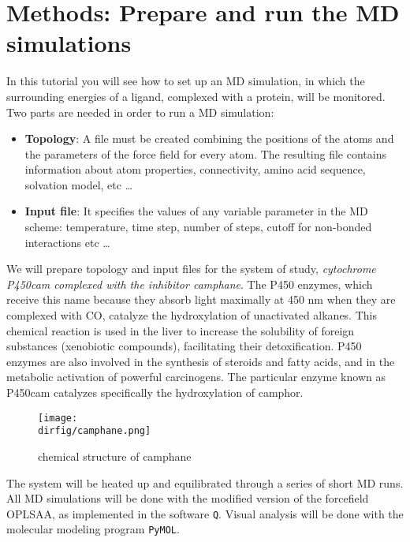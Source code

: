 \documentclass[a4paper,12pt]{article}
\newcommand{\q}{\texttt{Q}}
\newcommand{\pymol}{\texttt{PyMOL}}
\newcommand{\dirfig}{./images}
\begin{document}
\section{Methods: Prepare and run the MD simulations}
In this tutorial you will see how to set up an MD simulation, in which the surrounding energies of a ligand, complexed with a protein, will be monitored.\\
Two parts are needed in order to run a MD simulation:
\begin {itemize}
\item {\bf Topology}: A file must be created combining the positions of the atoms and the parameters of the force field for every atom. The resulting file contains information about atom properties, connectivity, amino acid sequence, solvation model, etc \ldots
\item {\bf Input file}: It specifies the values of any variable parameter in the MD scheme: temperature, time step, number of steps, cutoff for non-bonded interactions etc \ldots
\end {itemize}
We will prepare topology and input files for the system of study, {\it cytochrome P450cam complexed with the inhibitor camphane}. The P450 enzymes, which receive this name because they absorb light maximally at 450 nm when they are complexed with CO, catalyze the hydroxylation of unactivated alkanes. This chemical reaction is used in the liver to increase the solubility of foreign substances (xenobiotic compounds), facilitating their detoxification. P450 enzymes are also involved in the synthesis of steroids and fatty acids, and in the metabolic activation of powerful carcinogens. The particular enzyme known as P450cam catalyzes specifically the hydroxylation of camphor.\\
\begin{figure}[ht]
\centering
\texttt{[image: \\dirfig/camphane.png]}
\caption{\label{cam} chemical structure of camphane}
\end{figure}
The system will be heated up and equilibrated through a series of
short MD runs. All MD simulations will be done with the modified
version of the forcefield OPLSAA, as implemented in the software
{\q}. Visual analysis will be done with the molecular modeling
program {\pymol}.
\end{document}
